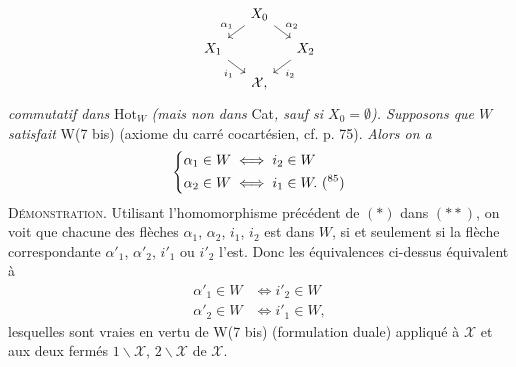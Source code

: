\documentclass[11pt]{article}
\newcommand{\printedpage}[1]{\marginpar{\footnotesize p.~#1}}
\newcommand{\msp}[1]{\marginpar{\footnotesize [#1]}}
\newcommand{\Hot}{\mathrm{Hot}}
\newcommand{\cX}{\mathcal{X}}
\begin{document}
\printedpage{85}
\[
\begin{tikzcd}[column sep=small, row sep=small, ampersand replacement=\&]
 \& X_0 \arrow[dl, "\alpha_1"'] \arrow[dr, "\alpha_2"] \& \\
X_1 \arrow[dr, "i_1"'] \& \& X_2 \arrow[dl, "i_2"] \\
 \& \cX, \&
\end{tikzcd}
\]
\msp{page 126}
\textit{commutatif dans} $\Hot_W$ \textit{(mais non dans} Cat\textit{, sauf si $X_0 = \emptyset$). Supposons que $W$ satisfait} W(7 bis) (axiome du carré cocartésien, cf. p. 75). \textit{Alors on a}
\[
\left\{
\begin{aligned}
\alpha_1\in W &\iff i_2\in W\\
\alpha_2\in W &\iff i_1\in W. \text{ (\footnotemark[85])}
\end{aligned}
\right.
\]
\textsc{Démonstration}. Utilisant l'homomorphisme précédent de $(*)$ dans $(**)$, on voit que chacune des flèches $\alpha_1$, $\alpha_2$, $i_1$, $i_2$ est dans $W$, si et seulement si la flèche correspondante $\alpha'_1$, $\alpha'_2$, $i'_1$ ou $i'_2$ l'est. Donc les équivalences ci-dessus équivalent à
\[
\begin{aligned}
\alpha'_1\in W &\iff i'_2\in W\\
\alpha'_2\in W &\iff i'_1\in W,
\end{aligned}
\]
lesquelles sont vraies en vertu de W(7 bis) (formulation duale) appliqué à $\cX$ et aux deux fermés $1\backslash\cX$, $2\backslash\cX$ de $\cX$.
\end{document}
